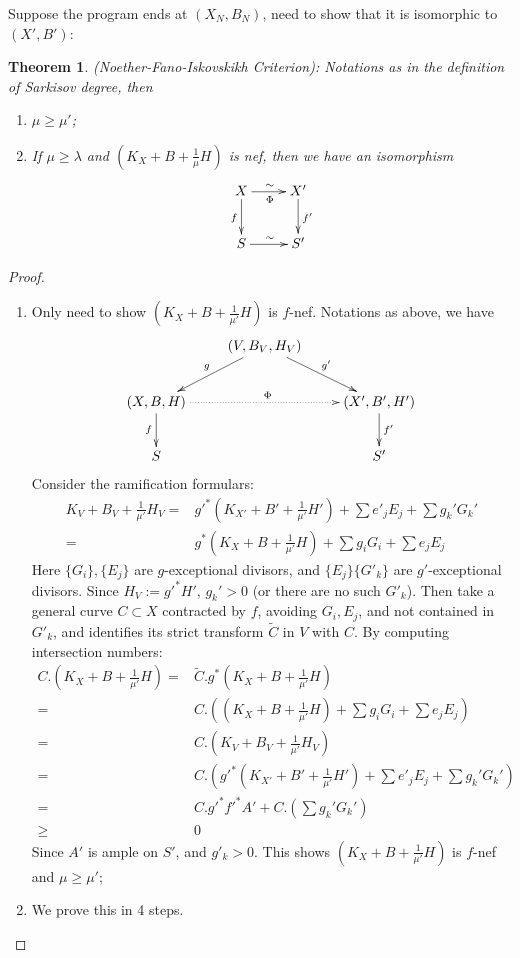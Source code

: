 \documentclass{article}
\newtheorem{thm}[defn]{Theorem}
\begin{document}
Suppose the program ends at $ (X_N,B_N) $, need to show that it is isomorphic to $ (X',B') $:
\begin{thm}\label{nfi}
	(Noether-Fano-Iskovskikh Criterion): Notations as in the definition of Sarkisov degree, then 
	\begin{enumerate}
		\item $ \mu\geqslant \mu' $;
		\item If $ \mu \geqslant \lambda $ and $ (K_X+B+\frac{1}{\mu} H) $ is nef, then we have an isomorphism
		$$ \xymatrix{
			X\ar[r]^\sim_\Phi\ar[d]_f&X'\ar[d]^{f'}\\
			S\ar[r]^\sim& S' } $$
	\end{enumerate}
\end{thm}
\begin{proof}
	\begin{enumerate}
		\item Only need to show $ (K_X+B+\frac{1}{\mu'}H) $ is $ f $-nef. Notations as above, we have
		$$ \xymatrix{
			&(V,B_V,H_V)\ar[dl]_g\ar[dr]^{g'}&\\
			(X,B,H)\ar[d]_f\ar@{.>}[rr]^\Phi&&(X',B',H')\ar[d]^{f'}\\
			S&&S'} $$
		Consider the ramification formulars:
		\begin{equation}
			\begin{aligned}	
				K_V+B_V+\frac{1}{\mu'}H_V=&g'^*(K_{X'}+B'+\frac{1}{\mu'}H')+\sum e'_jE_j+ \sum g_k'G_k'\\
				=&g^*(K_{X}+B+\frac{1}{\mu'}H)+\sum g_iG_i+\sum e_jE_j
			\end{aligned}
		\end{equation}
		Here $ \{G_i\}, \{E_j\} $ are $ g $-exceptional divisors, and $ \{E_j\}\{G'_k\} $ are $ g' $-exceptional divisors. Since $H_V:=g'^*H' $, $ g_k'>0 $ (or there are no such $ G'_k $). Then take a general curve $ C\subset X $ contracted by $ f $,  avoiding $ G_i, E_j $, and not contained in $ G'_k $, and identifies its strict transform $ \tilde{C} $ in $ V $ with $ C $. By computing intersection numbers:
		\begin{equation*}
			\begin{aligned}
				C.(K_X+B+\frac{1}{\mu'}H)=&\tilde{C}.g^*(K_X+B+\frac{1}{\mu'}H)
				\\=&C.((K_X+B+\frac{1}{\mu'}H)+\sum g_iG_i+\sum e_jE_j)\\
				=&C.(K_V+B_V+\frac{1}{\mu'}H_V)\\
				=&C.(g'^*(K_{X'}+B'+\frac{1}{\mu'}H')+\sum e'_jE_j+ \sum g_k'G_k')\\
				=&C.g'^*f'^*A'+C.(\sum g_k'G_k')\\
				\geqslant&0
			\end{aligned}
		\end{equation*}
		Since $ A' $ is ample on $ S' $, and $ g'_k>0 $. This shows $ (K_X+B+\frac{1}{\mu'}H) $ is $ f $-nef and $ \mu\geqslant \mu' $;
		\item We prove this in 4 steps.
		

\end{enumerate}
\end{proof}
\end{document}
